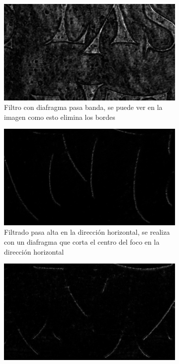 \documentclass{./packages/optica-article}
\begin{document}
\begin{figure}[hptb]
	\begin{center}
		\begin{subfigure}[t]{0.45\textwidth}\centering
			\includegraphics[width=\textwidth]{parte4-filtrado/4f-pic-2ocm-diafragm-10cm-camera-letters-diafragma_y_punto-pasabanda.png}
			\caption{Filtro con diafragma pasa banda, se puede ver en la imagen como esto elimina los bordes}
			\label{fig:filtrado1}
		\end{subfigure}
		\quad
		\begin{subfigure}[t]{0.45\textwidth}\centering
			\includegraphics[width=\textwidth]{parte4-filtrado/4f-pic-2ocm-diafragm-10cm-camera-letters-high-frequency-almost-x.png}
			\caption{Filtrado pasa alta en la dirección horizontal, se realiza con un diafragma que corta el centro del foco en la dirección horizontal}
			\label{fig:filtrado2}
		\end{subfigure}
		\begin{subfigure}[t]{0.45\textwidth}\centering
			\includegraphics[width=\textwidth]{parte4-filtrado/4f-pic-2ocm-diafragm-10cm-camera-letters-high-frequency-dot-down.png}

\end{subfigure}
\end{center}
\end{figure}
\end{document}
